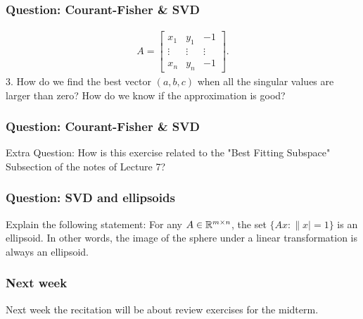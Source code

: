 \documentclass{beamer}
\begin{document}
\begin{frame}[t]
\frametitle{Question: Courant-Fisher \& SVD}
\vspace{-20pt}
\begin{align*}
A = 
\begin{bmatrix}
x_1 & y_1 & -1 \\
\vdots & \vdots & \vdots \\ 
x_n & y_n & -1
\end{bmatrix}.
\end{align*}
3. How do we find the best vector $(a,b,c)$ when all the singular values are larger than zero? How do we know if the approximation is good?
\pause
\pause
\end{frame}

\begin{frame}[t]
\frametitle{Question: Courant-Fisher \& SVD}
Extra Question: How is this exercise related to the "Best Fitting Subspace" Subsection of the notes of Lecture 7?
\pause
\end{frame}



\begin{frame}[t]
\frametitle{Question: SVD and ellipsoids}
Explain the following statement: For any $A \in \mathbb{R}^{m \times n}$, the set $\{ Ax : \|x| = 1 \}$ is an ellipsoid. In other words, the image of the sphere under a linear transformation is always an ellipsoid.
\pause
\end{frame}

\begin{frame}[t]
\frametitle{Next week}
Next week the recitation will be about review exercises for the midterm.

\end{frame}

\begin{frame}[t]

\end{frame}

\begin{frame}[t]

\end{frame}
\end{document}
